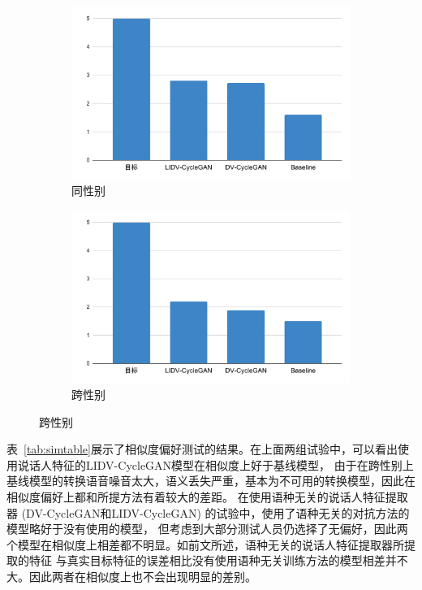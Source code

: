 \begin{figure}[!ht]
    \begin{minipage}[b]{\linewidth}
        \begin{subfigure}[b]{0.48\linewidth}
            \centering
            \includegraphics[width=\linewidth,trim=0 0 0 0,clip]{figure/5_mosintra.pdf}
            \caption{同性别}
        \end{subfigure}        
        \begin{subfigure}[b]{0.48\linewidth}
            \centering
            \includegraphics[width=\linewidth,trim=0 0 0 0,clip]{figure/5_mosinter.pdf}
            \caption{跨性别}
        \end{subfigure}   
    \end{minipage}
    \label{fig:mos2}
\end{figure}

表~\ref{tab:simtable}展示了相似度偏好测试的结果。在上面两组试验中，可以看出使用说话人特征的LIDV-CycleGAN模型在相似度上好于基线模型，
由于在跨性别上基线模型的转换语音噪音太大，语义丢失严重，基本为不可用的转换模型，因此在相似度偏好上都和所提方法有着较大的差距。
在使用语种无关的说话人特征提取器 (DV-CycleGAN和LIDV-CycleGAN) 的试验中，使用了语种无关的对抗方法的模型略好于没有使用的模型，
但考虑到大部分测试人员仍选择了无偏好，因此两个模型在相似度上相差都不明显。如前文所述，语种无关的说话人特征提取器所提取的特征
与真实目标特征的误差相比没有使用语种无关训练方法的模型相差并不大。因此两者在相似度上也不会出现明显的差别。

